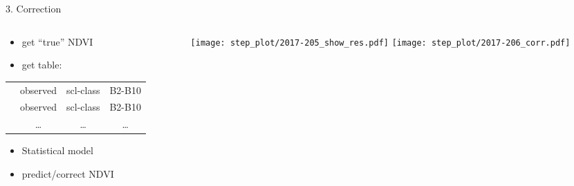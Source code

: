 \begin{frame}[t]{3. Correction}
    \begin{columns}
        \begin{column}{0.45\textwidth}
            \begin{itemize}
                \item get ``true'' NDVI
                \item get table:
            \end{itemize}

            \scriptsize
            \begin{tabular}{| c |  c c c |}
                \hline
                \color{myred}{``truth''} & observed & scl-class & B2-B10 \\
                \color{myred}{``truth''} & observed & scl-class & B2-B10 \\
                \color{myred}{\dots    } & \dots    & \dots     & \dots  \\
            \end{tabular}\normalsize \vspace{0.5cm}
            \begin{itemize}
                \item Statistical model
                \item predict/correct NDVI
            \end{itemize}
        \end{column}
        \begin{column}{0.42\textwidth}
            \begin{figure}
                \vspace{-1.8cm}
                \texttt{[image: step\_plot/2017-205\_show\_res.pdf]}
                \texttt{[image: step\_plot/2017-206\_corr.pdf]}
            \end{figure}
        \end{column}
    \end{columns}
\end{frame}

